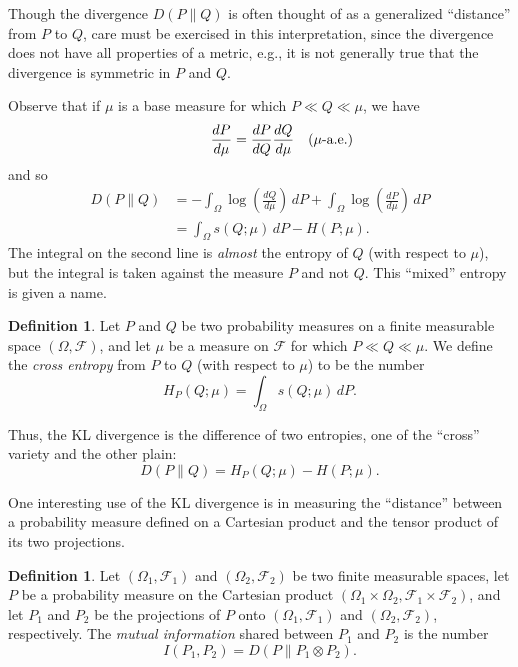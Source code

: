 \documentclass[11pt]{book}
\theoremstyle{definition}
\newtheorem{defn}[thm]{Definition}
\numberwithin{equation}{section}
\begin{document}
Though the divergence $D(P \parallel Q)$ is often thought of as a generalized ``distance'' from $P$ to $Q$, care must be exercised in this interpretation, since the divergence does not have all properties of a metric, e.g., it is not generally true that the divergence is symmetric in $P$ and $Q$.

Observe that if $\mu$ is a base measure for which $P \ll Q \ll \mu$, we have
\[
	\frac{dP}{d\mu} = \frac{dP}{dQ} \frac{dQ}{d\mu} \quad \mathrlap{(\mu\text{-a.e.})}
\]
and so
\begin{align*}
	D(P \parallel Q) & = - \int_\Omega \log{ \left( \frac{dQ}{d\mu} \right)} \, dP +  \int_\Omega \log{ \left( \frac{dP}{d\mu} \right)} \, dP \\
	                 & = \int_\Omega s(Q;\mu) \, dP - H(P;\mu).
\end{align*}
The integral on the second line is \textit{almost} the entropy of $Q$ (with respect to $\mu$), but the integral is taken against the measure $P$ and not $Q$. This ``mixed'' entropy is given a name.

\begin{defn}
	Let $P$ and $Q$ be two probability measures on a finite measurable space $(\Omega,\mathcal{F})$, and let $\mu$ be a measure on $\mathcal{F}$ for which $P \ll Q \ll \mu$. We define the \textit{cross entropy} from $P$ to $Q$ (with respect to $\mu$) to be the number
	\[
		H_P(Q; \mu) = \int_\Omega s(Q;\mu) \, dP.
	\]
\end{defn}

Thus, the KL divergence is the difference of two entropies, one of the ``cross'' variety and the other plain:
\[
	D(P \parallel Q) = H_P(Q;\mu) - H(P;\mu).
\]

One interesting use of the KL divergence is in measuring the ``distance'' between a probability measure defined on a Cartesian product and the tensor product of its two projections.

\begin{defn}
	Let $(\Omega_1, \mathcal{F}_1)$ and $(\Omega_2, \mathcal{F}_2)$ be two finite measurable spaces, let $P$ be a probability measure on the Cartesian product $(\Omega_1 \times \Omega_2, \mathcal{F}_1 \times \mathcal{F}_2)$, and let $P_1$ and $P_2$ be the projections of $P$ onto $(\Omega_1, \mathcal{F}_1)$ and $(\Omega_2, \mathcal{F}_2)$, respectively. The \textit{mutual information} shared between $P_1$ and $P_2$ is the number
	\[
		I(P_1,P_2) = D(P \parallel P_1 \otimes P_2).
	\]
\end{defn}
\end{document}
